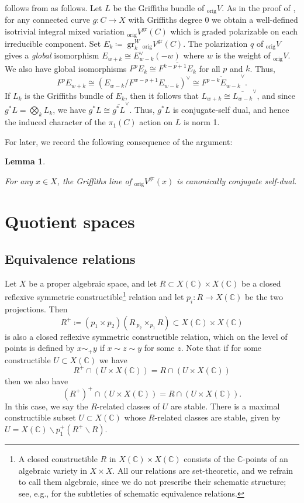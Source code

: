 \documentclass{amsart}
\newcommand{\bs}{\backslash}
\newtheorem{lemma}[theorem]{Lemma}
\theoremstyle{definition}
\theoremstyle{remark}
\def\bC{\mathbb{C}}
\def\gr{\operatorname{gr}}
\def\orig{\mathrm{orig}}
\numberwithin{equation}{section}
\begin{document}
 follows from  as follows.  Let $L$ be the Griffiths bundle of $_\orig V$.  As in the proof of , for any connected curve $g:C\to X$ with Griffiths degree 0 we obtain a well-defined isotrivial integral mixed variation ${ _\orig V}^{\gr}(C)$ which is graded polarizable on each irreducible component.  Set $E_k\coloneqq  \gr_k^W{ _\orig V}^{\gr}(C)$.  The polarization $q$ of $_\orig V$ gives a \emph{global} isomorphism $E_{w+k}\cong E_{w-k}^\vee (-w)$ where $w$ is the weight of $_\orig V$.  We also have global isomorphisms $F^pE_k\cong \overline{F^{k-p+1}E_k}$ for all $p$ and $k$.  Thus, 
\[F^pE_{w+k}\cong (E_{w-k}/F^{w-p+1}E_{w-k})^\vee\cong \overline{F^{p-k}E_{w-k}}^\vee.\]
If $L_k$ is the Griffiths bundle of $E_k$, then it follows that $L_{w+k}\cong \overline{L_{w-k}}^\vee$, and since $g^*L=\bigotimes_k L_{k}$, we have $g^*L\cong \overline{g^*L}^\vee$. Thus, $g^*L$ is conjugate-self dual, and hence the induced character of the $\pi_1(C)$ action on $L$ is norm 1. 

For later, we record the following consequence of the argument:

\begin{lemma}\label{lem:conjsdgriffiths}

For any $x\in X$, the Griffiths line of $_\orig V^{\gr}(x)$ is canonically conjugate self-dual.
\end{lemma}






\section{Quotient spaces}






\subsection{Equivalence relations}\label{subsect:equiv reln}Let $X$ be a proper algebraic space, and let $R\subset X(\bC)\times X(\bC)$ be a closed reflexive symmetric constructible\footnote{A closed constructible $R$ in $X(\bC)\times X(\bC)$ consists of the $\bC$-points of an algebraic variety in $X\times X$. All our relations are set-theoretic, and we refrain to call them algebraic, since we do not prescribe their schematic structure; see, e.g., \cite[Ex.~3]{K2012} for the subtleties of schematic equivalence relations.} relation and let $p_i:R\to X(\bC)$ be the two projections.  Then
\[R^+\coloneqq  (p_1\times p_2)(R\,{_{p_2}\times_{p_1}} R)\subset X(\bC)\times X(\bC)\]
is also a closed reflexive symmetric constructible relation, which on the level of points is defined by $x\sim_+ y$ if $x\sim z\sim y$ for some $z$.  Note that if for some constructible $U\subset X(\bC)$ we have 
\[R^+\cap (U\times X(\bC))=R\cap (U\times X(\bC))\]
then we also have 
\[(R^+)^+\cap(U\times X(\bC))=R\cap(U\times X(\bC)).\]
In this case, we say the $R$-related classes of $U$ are stable.  There is a maximal constructible subset $U\subset X(\bC)$ whose $R$-related classes are stable, given by $U=X(\bC)\bs p^+_1(R^+\bs R) $.
\end{document}
